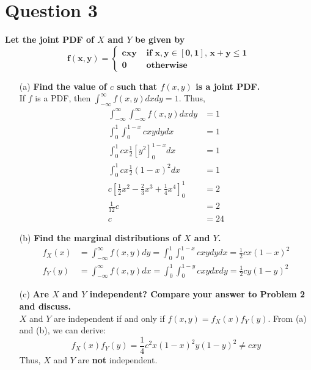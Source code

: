 \documentclass{article}
\newcommand{\intinf}{\int_{-\infty}^{\infty}}
\begin{document}
\section*{Question 3}
\textbf{Let the joint PDF of $X$ and $Y$ be given by}
\[
	\mathbf{f(x,y) = \begin{cases} cxy &\text{ if } x,y\in[0,1]\text{, }x+y\leq 1 \\ 0 &\text{ otherwise} \end{cases}}
\]
\begin{itemize}
	\item[(a)] \textbf{Find the value of $c$ such that $f(x,y)$ is a joint PDF.}
	\bigskip \\
	If $f$ is a PDF, then $\intinf f(x,y)dxdy=1$. Thus,
	\begin{align*}
		\intinf\intinf f(x,y)dxdy 											&= 1	\\
		\int_0^1 \int_0^{1-x} cxy dydx										&= 1	\\
		\int_0^1 cx\frac{1}{2}[y^2]^{1-x}_0 dx								&= 1	\\
		\int_0^1 cx\frac{1}{2}(1-x)^2 dx									&= 1	\\
		c\left[\frac{1}{2}x^2 - \frac{2}{3}x^3 +\frac{1}{4}x^4\right]^1_0	&= 2	\\
		\frac{1}{12}c														&= 2	\\
		c																	&= 24
	\end{align*}

	\item[(b)] \textbf{Find the marginal distributions of $X$ and $Y$.}
	\bigskip \\
	\begin{align*}
		f_X(x) &= \intinf f(x,y)dy = \int_0^1 \int_0^{1-x} cxy dydx = \frac{1}{2}cx(1-x)^2	\\
		f_Y(y) &= \intinf f(x,y)dx = \int_0^1 \int_0^{1-y} cxy dxdy = \frac{1}{2}cy(1-y)^2
	\end{align*}
	

	\item[(c)] \textbf{Are $X$ and $Y$ independent? Compare your answer to Problem 2 and discuss.}
	\bigskip \\
	$X$ and $Y$ are independent if and only if $f(x,y)=f_X(x)f_Y(y)$. From (a) and (b), we can derive:
	\[
		f_X(x)f_Y(y) = \frac{1}{4}c^2x(1-x)^2y(1-y)^2 \neq cxy
	\]
	Thus, $X$ and $Y$ are \textbf{not} independent.
	
	
\end{itemize}


\end{document}
